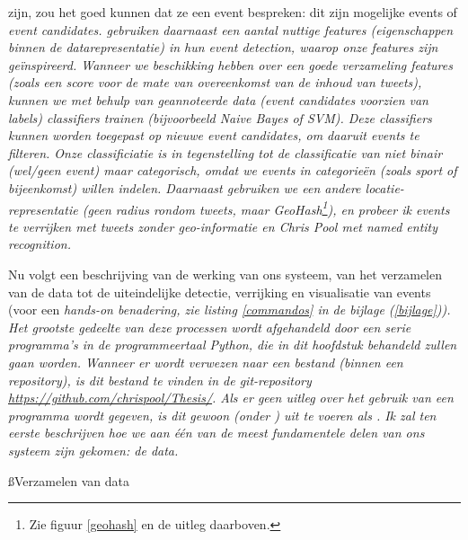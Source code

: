 {{zijn, zou het goed kunnen dat ze een event bespreken: dit zijn mogelijke events of \it{event candidates}. 
\citet{walther2013geo} gebruiken daarnaast een aantal nuttige \it{features} (eigenschappen binnen de datarepresentatie) in 
hun event detection, waarop onze features zijn geïnspireerd. Wanneer we beschikking hebben over een
goede verzameling features (zoals een score voor de mate van overeenkomst van de inhoud van tweets), kunnen
we met behulp van geannoteerde data (event candidates voorzien van labels) \it{classifiers} trainen (bijvoorbeeld \it{Naive Bayes} of \it{SVM}). Deze classifiers kunnen
worden toegepast op nieuwe event candidates, om daaruit events te filteren. Onze classificiatie 
is in tegenstelling tot de classificatie van \citet{walther2013geo} niet \it{binair} (wel/geen event) maar \it{categorisch}, omdat we
events in categorieën (zoals \it{sport} of \it{bijeenkomst}) willen indelen. Daarnaast gebruiken we een andere 
locatie-representatie (geen radius rondom tweets, maar \it{GeoHash}\footnote{Zie 
figuur \ref{geohash} en de uitleg daarboven.}), en probeer ik events te verrijken met tweets zonder geo-informatie en 
Chris Pool met \it{named entity recognition}.

\label{methode}

Nu volgt een beschrijving van de werking van ons systeem, van het verzamelen 
van de data tot de uiteindelijke detectie, verrijking en visualisatie van 
events (voor een \it{hands-on} benadering, zie listing \ref{commandos} in de bijlage (\ref{bijlage})). Het grootste gedeelte van deze processen wordt afgehandeld door een 
serie programma's in de programmeertaal Python, die in dit hoofdstuk behandeld 
zullen gaan worden. Wanneer er wordt verwezen naar een bestand (binnen een 
repository), is dit bestand te vinden in de git-repository 
\url{https://github.com/chrispool/Thesis/}. Als er geen uitleg over het gebruik 
van een programma wordt gegeven, is dit gewoon (onder ) uit te voeren als 
. Ik zal ten eerste beschrijven hoe we aan \'e\'en van de 
meest fundamentele delen van ons systeem zijn gekomen: de data.

\ss{Verzamelen van data}\label{dataverzamelen}

}}
